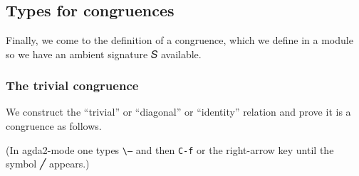 \documentclass[sigplan,screen]{acmart}
\begin{document}
\begin{code}\>[0]\AgdaSpace{}%
\AgdaSymbol{:}%
\>[806I]\AgdaSymbol{\{}\AgdaSpace{}%
\AgdaSymbol{:}\AgdaSpace{}%
\AgdaSpace{}%
\AgdaSpace{}%
\AgdaSymbol{\}}\AgdaSpace{}%
\AgdaSymbol{\{}\AgdaSpace{}%
\AgdaSymbol{:}\AgdaSpace{}%
\AgdaSpace{}%
\AgdaSpace{}%
\AgdaSymbol{\}}\<%
\\
\>[.][@{}l@{}]\<[806I]%
\>[17]\AgdaSymbol{(}\AgdaSpace{}%
\AgdaSymbol{:}\AgdaSpace{}%
\AgdaSymbol{(}\AgdaSpace{}%
\AgdaSpace{}%
\AgdaSymbol{)}\AgdaSpace{}%
\AgdaSpace{}%
\AgdaSymbol{)(}\AgdaSpace{}%
\AgdaSymbol{:}\AgdaSpace{}%
\AgdaSpace{}%
\AgdaSpace{}%
\AgdaSymbol{)}\<%
\\
\>[0][@{}l@{\AgdaIndent{0}}]%
\>[1]%
\>[17]\AgdaSpace{}%
\AgdaSpace{}%
\AgdaSpace{}%
\AgdaSpace{}%
\AgdaSpace{}%
\<%
\\
\>[0]\AgdaSpace{}%
\AgdaSpace{}%
%
\>[20]\AgdaSymbol{=}\AgdaSpace{}%
\AgdaSymbol{(}\AgdaSpace{}%
\AgdaSymbol{)}\AgdaSpace{}%
\AgdaOperator{\AgdaFunction{=[}}\AgdaSpace{}%
\AgdaSpace{}%
\AgdaOperator{\AgdaFunction{]⇒}}\AgdaSpace{}%
\<%
\end{code}

\subsection{Types for congruences}\label{types-for-congruences}
Finally, we come to the definition of a congruence, which we define in a module so we have an ambient signature 𝑆 available.

\begin{code}\end{code}

\subsubsection{The trivial congruence}\label{the-trivial-congruence}
We construct the ``trivial'' or ``diagonal'' or ``identity'' relation and prove it is a congruence as follows.
\begin{code}\end{code}
\noindent (In agda2-mode one types \texttt{\textbackslash ---} and then \texttt{C-f} or the right-arrow key until the symbol ╱ appears.)
\end{document}
